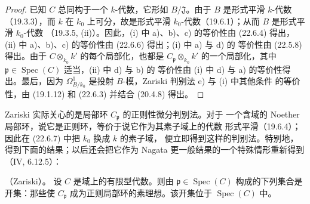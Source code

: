 \begin{proof}
已知 $C$ 总同构于一个 $k$-代数，它形如 $B/\mathfrak J$。由于 $B$ 是形式平滑
$k$-代数（19.3.3），而 $k$ 在 $k_0$ 上可分，故是形式平滑
$k_0$-代数（19.6.1）；从而 $B$ 是形式平滑 $k_0$-代数
（19.3.5, (ii)）。因此，(i) 中 a)、b)、c) 的等价性由 (22.6.4) 得出，
(ii) 中 a)、b)、c) 的等价性由 (22.6.6) 得出；(i) 中 a) 与 d) 的
等价性由 (22.5.8) 得出。由于 $C\otimes_{k_0}k'$ 的每个局部化，也都是
$C_{\mathfrak p}\otimes_{k_0}k'$ 的一个局部化，其中
$\mathfrak p\in\operatorname{Spec}(C)$ 适当，(ii) 中 d) 与 b) 的
等价性由 (i) 中 d) 与 a) 的等价性得出。最后，因为
$\Omega^1_{B/k_0}$ 是投射 $B$-模，Zariski 判别法 e) 与 (i) 中其他条件
的等价性，由 (19.1.12) 和 (22.6.3) 并结合 (20.4.8) 得出。
\end{proof}

Zariski 实际关心的是局部环 $C_{\mathfrak p}$ 的正则性微分判别法。对于
一个含域的 Noether 局部环，说它是正则环，等价于说它作为其素子域上的代数
形式平滑（19.6.4）；因此在 (22.6.7) 中把 $k_0$ 换成 $k$ 的素子域，
便立即得到这样的判别法。特别地，得到下面的结果；以后还会把它作为 Nagata
更一般结果的一个特殊情形重新得到（IV, 6.12.5）：

\begin{corollary}[22.6.8]
\label{0.22.6.8-fr}
\textnormal{（Zariski）。}
设 $C$ 是域上的有限型代数。则由
$\mathfrak p\in\operatorname{Spec}(C)$ 构成的下列集合是开集：那些使
$C_{\mathfrak p}$ 成为正则局部环的素理想。该开集位于
$\operatorname{Spec}(C)$ 中。
\end{corollary}


